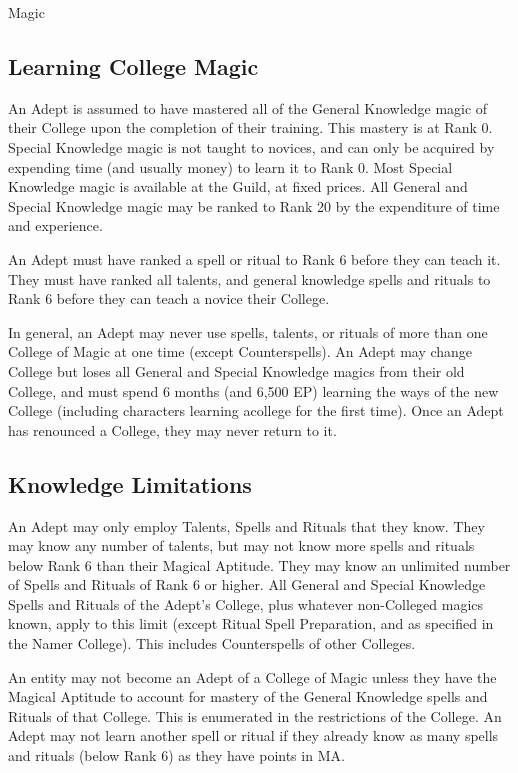 \begin{Chapter}{Magic}
\subsection{Learning College Magic}

An Adept is assumed to have mastered all of the General Knowledge
magic of their College upon the completion of their training. This
mastery is at Rank 0. Special Knowledge magic is not taught to
novices, and can only be acquired by expending time (and usually
money) to learn it to Rank 0.  Most Special Knowledge magic is
available at the Guild, at fixed prices.  All General and Special
Knowledge magic may be ranked to Rank 20 by the expenditure of time
and experience.

An Adept must have ranked a spell or ritual to Rank 6 before they can
teach it.  They must have ranked all talents, and general knowledge
spells and rituals to Rank 6 before they can teach a novice their
College.

In general, an Adept may never use spells, talents, or rituals of more
than one College of Magic at one time (except Counterspells). An Adept
may change College but loses all General and Special Knowledge magics
from their old College, and must spend 6 months (and 6,500 EP)
learning the ways of the new College (including characters learning
acollege for the first time).  Once an Adept has renounced a College,
they may never return to it.

\subsection{Knowledge Limitations}

An Adept may only employ Talents, Spells and Rituals that they
know. They may know any number of talents, but may not know more
spells and rituals below Rank 6 than their Magical Aptitude.  They may
know an unlimited number of Spells and Rituals of Rank 6 or higher.
All General and Special Knowledge Spells and Rituals of the Adept’s
College, plus whatever non-Colleged magics known, apply to this limit
(except Ritual Spell Preparation, and as specified in the Namer
College).  This includes Counterspells of other Colleges.

An entity may not become an Adept of a College of Magic unless they
have the Magical Aptitude to account for mastery of the General
Knowledge spells and Rituals of that College.  This is enumerated in
the restrictions of the College.  An Adept may not learn another spell
or ritual if they already know as many spells and rituals (below Rank
6) as they have points in MA.


\end{Chapter}
